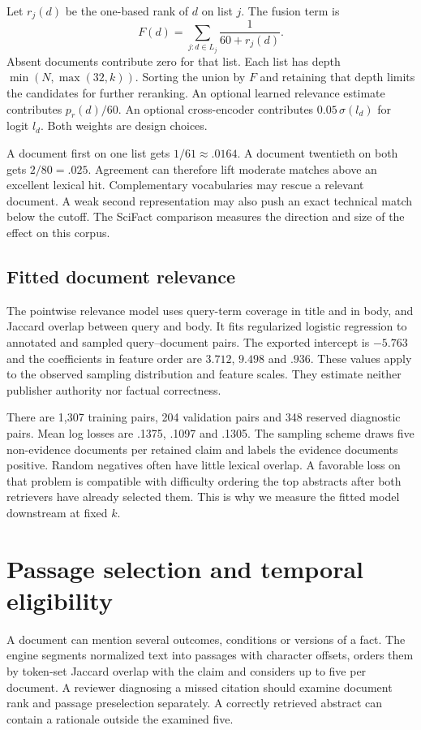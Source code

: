 Let $r_j(d)$ be the one-based rank of $d$ on list $j$. The fusion term is
\[
 F(d)=\sum_{j:d\in L_j}\frac{1}{60+r_j(d)} .
\]
Absent documents contribute zero for that list. Each list has depth $\min(N,\max(32,k))$. Sorting the union by $F$ and retaining that depth limits the candidates for further reranking. An optional learned relevance estimate contributes $p_r(d)/60$. An optional cross-encoder contributes $0.05\,\sigma(l_d)$ for logit $l_d$. Both weights are design choices.

A document first on one list gets $1/61\approx .0164$. A document twentieth on both gets $2/80=.025$. Agreement can therefore lift moderate matches above an excellent lexical hit. Complementary vocabularies may rescue a relevant document. A weak second representation may also push an exact technical match below the cutoff. The SciFact comparison measures the direction and size of the effect on this corpus.

\subsection{Fitted document relevance}
The pointwise relevance model uses query-term coverage in title and in body, and Jaccard overlap between query and body. It fits regularized logistic regression to annotated and sampled query--document pairs. The exported intercept is $-5.763$ and the coefficients in feature order are $3.712$, $9.498$ and $.936$. These values apply to the observed sampling distribution and feature scales. They estimate neither publisher authority nor factual correctness.

There are 1,307 training pairs, 204 validation pairs and 348 reserved diagnostic pairs. Mean log losses are .1375, .1097 and .1305. The sampling scheme draws five non-evidence documents per retained claim and labels the evidence documents positive. Random negatives often have little lexical overlap. A favorable loss on that problem is compatible with difficulty ordering the top abstracts after both retrievers have already selected them. This is why we measure the fitted model downstream at fixed $k$.

\section{Passage selection and temporal eligibility}
A document can mention several outcomes, conditions or versions of a fact. The engine segments normalized text into passages with character offsets, orders them by token-set Jaccard overlap with the claim and considers up to five per document. A reviewer diagnosing a missed citation should examine document rank and passage preselection separately. A correctly retrieved abstract can contain a rationale outside the examined five.

